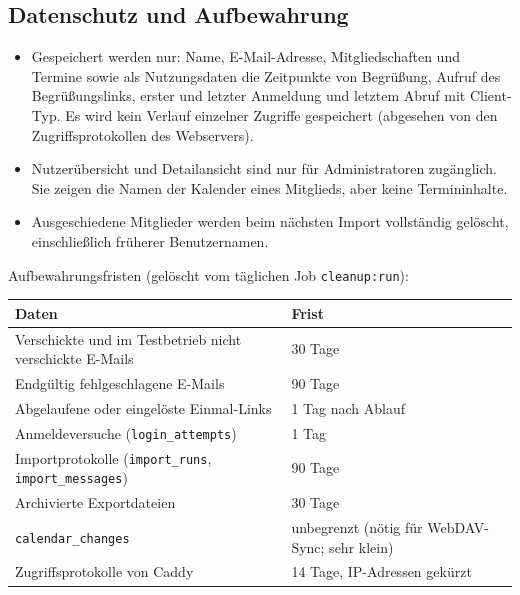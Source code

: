 \documentclass[a4paper,fontsize=10pt]{scrartcl}
\newcommand{\code}[1]{\texttt{#1}}
\begin{document}
\subsection*{Datenschutz und Aufbewahrung}

\begin{itemize}
  \item Gespeichert werden nur: Name, E-Mail-Adresse, Mitgliedschaften und
        Termine sowie als Nutzungsdaten die Zeitpunkte von Begrüßung,
        Aufruf des Begrüßungslinks, erster und letzter Anmeldung und letztem
        Abruf mit Client-Typ. Es wird kein Verlauf einzelner Zugriffe
        gespeichert (abgesehen von den Zugriffsprotokollen des Webservers).
  \item Nutzerübersicht und Detailansicht sind nur für Administratoren
        zugänglich. Sie zeigen die Namen der Kalender eines Mitglieds, aber
        keine Termininhalte.
  \item Ausgeschiedene Mitglieder werden beim nächsten Import vollständig
        gelöscht, einschließlich früherer Benutzernamen.
\end{itemize}

Aufbewahrungsfristen (gelöscht vom täglichen Job \code{cleanup:run}):

\begin{center}
\begin{tabularx}{\textwidth}{L{6.2cm}X}
\toprule
\textbf{Daten} & \textbf{Frist} \\
\midrule
Verschickte und im Testbetrieb nicht verschickte E-Mails & 30 Tage \\
Endgültig fehlgeschlagene E-Mails & 90 Tage \\
Abgelaufene oder eingelöste Einmal-Links & 1 Tag nach Ablauf \\
Anmeldeversuche (\code{login\_attempts}) & 1 Tag \\
Importprotokolle (\code{import\_runs}, \code{import\_messages}) & 90 Tage \\
Archivierte Exportdateien & 30 Tage \\
\code{calendar\_changes} & unbegrenzt (nötig für WebDAV-Sync; sehr klein) \\
Zugriffsprotokolle von Caddy & 14 Tage, IP-Adressen gekürzt \\
\bottomrule
\end{tabularx}
\end{center}


\end{document}
